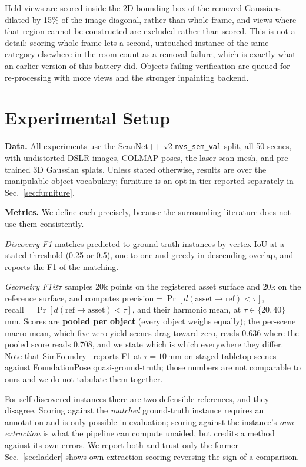 Held views are scored inside the 2D bounding box of the removed Gaussians
dilated by 15\% of the image diagonal, rather than whole-frame, and views
where that region cannot be constructed are excluded rather than scored.
This is not a detail: scoring whole-frame lets a second, untouched
instance of the same category elsewhere in the room count as a removal
failure, which is exactly what an earlier version of this battery did.
Objects failing verification are queued for re-processing with more views
and the stronger inpainting backend.

\section{Experimental Setup}
\label{sec:setup}

\textbf{Data.} All experiments use the ScanNet++ v2 \texttt{nvs\_sem\_val}
split, all 50 scenes, with undistorted DSLR images, COLMAP poses, the
laser-scan mesh, and pre-trained 3D Gaussian splats. Unless stated
otherwise, results are over the manipulable-object vocabulary; furniture
is an opt-in tier reported separately in Sec.~\ref{sec:furniture}.

\textbf{Metrics.} We define each precisely, because the surrounding
literature does not use them consistently.

\emph{Discovery F1} matches predicted to ground-truth instances by
vertex IoU at a stated threshold (0.25 or 0.5), one-to-one and greedy in
descending overlap, and reports the F1 of the matching.

\emph{Geometry F1@$\tau$} samples 20k points on the registered asset
surface and 20k on the reference surface, and computes
$\mathrm{precision}=\Pr[d(\text{asset}\!\to\!\text{ref})<\tau]$,
$\mathrm{recall}=\Pr[d(\text{ref}\!\to\!\text{asset})<\tau]$, and their
harmonic mean, at $\tau\in\{20,40\}$\,mm. Scores are \textbf{pooled per
object} (every object weighs equally); the per-scene macro mean, which
five zero-yield scenes drag toward zero, reads 0.636 where the pooled
score reads 0.708, and we state which is which everywhere they differ.
Note that SimFoundry~\cite{simfoundry} reports F1 at $\tau{=}10$\,mm on
staged tabletop scenes against FoundationPose quasi-ground-truth; those
numbers are not comparable to ours and we do not tabulate them together.

For self-discovered instances there are two defensible references, and
they disagree. Scoring against the \emph{matched} ground-truth instance
requires an annotation and is only possible in evaluation; scoring
against the instance's \emph{own extraction} is what the pipeline can
compute unaided, but credits a method against its own errors. We report
both and trust only the former---Sec.~\ref{sec:ladder} shows own-extraction
scoring reversing the sign of a comparison.

